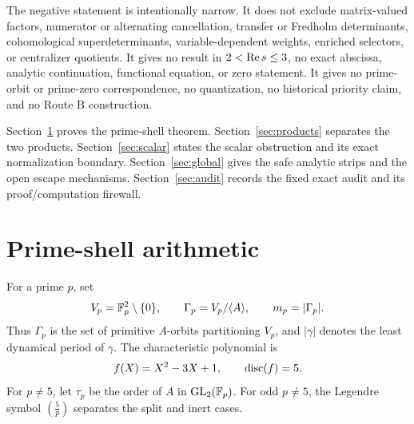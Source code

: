 \documentclass[11pt]{article}
\theoremstyle{definition}
\theoremstyle{remark}
\begin{document}
The negative statement is intentionally narrow.  It does not exclude
matrix-valued factors, numerator or alternating cancellation, transfer or
Fredholm determinants, cohomological superdeterminants, variable-dependent
weights, enriched selectors, or centralizer quotients.  It gives no result
in \(2<\operatorname{Re} s\le3\), no exact abscissa, analytic continuation, functional
equation, or zero statement.  It gives no prime-orbit or prime-zero
correspondence, no quantization, no historical priority claim, and no Route
B construction.

Section~\ref{sec:arithmetic} proves the prime-shell theorem.
Section~\ref{sec:products} separates the two products.
Section~\ref{sec:scalar} states the scalar obstruction and its exact
normalization boundary.  Section~\ref{sec:global} gives the safe analytic
strips and the open escape mechanisms.  Section~\ref{sec:audit} records the
fixed exact audit and its proof/computation firewall.

\section{Prime-shell arithmetic}
\label{sec:arithmetic}

For a prime \(p\), set
\begin{equation}
  V_p=\mathbb{F}_p^2\setminus\{0\},\qquad
  \Gamma_p=V_p/\langle A\rangle,\qquad
  m_p=|\Gamma_p|.
  \label{eq:shell-definitions}
\end{equation}
Thus \(\Gamma_p\) is the set of primitive \(A\)-orbits partitioning
\(V_p\), and \(|\gamma|\) denotes the least dynamical period of
\(\gamma\).  The characteristic polynomial is
\begin{equation}
  f(X)=X^2-3X+1,\qquad \operatorname{disc}(f)=5.
  \label{eq:characteristic}
\end{equation}
For \(p\ne5\), let \(\tau_p\) be the order of \(A\) in
\(\mathrm{GL}_2(\mathbb{F}_p)\).  For odd \(p\ne5\), the Legendre symbol
\(\left(\frac5p\right)\) separates the split and inert cases.
\end{document}
